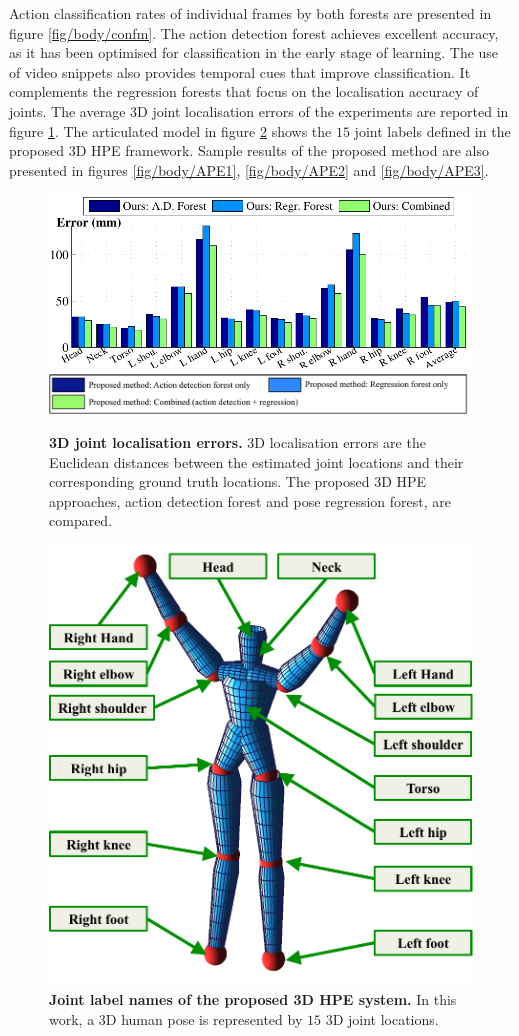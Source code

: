 Action classification rates of individual frames by both forests are presented in figure \ref{fig/body/confm}. 
The action detection forest achieves excellent accuracy, as it has been optimised for classification in the early stage of learning. The use of video snippets also provides temporal cues that improve classification. It complements the regression forests that focus on the localisation accuracy of joints.    
The average 3D joint localisation errors of the experiments are reported in figure \ref{fig/body/errorplot3d}. 
The articulated model in figure \ref{fig/body/jointlabels} shows the $15$ joint labels defined in the proposed 3D HPE framework.
Sample results of the proposed method are also presented in figures \ref{fig/body/APE1}, \ref{fig/body/APE2} and \ref{fig/body/APE3}. 

\begin{figure}[ht]
\centering
	\includegraphics[width=0.9\linewidth, trim = {0 0 0 8mm}, clip]{fig/body/errplot3d.pdf} 
	\includegraphics[width=1\linewidth]{fig/body/legend_small.pdf} 
	\caption{\textbf{3D joint localisation errors.} 3D localisation errors are the Euclidean distances between the estimated joint locations and their corresponding ground truth locations. The proposed 3D HPE approaches, \ie action detection forest and pose regression forest, are compared. }
\label{fig/body/errorplot3d}
\end{figure}

\begin{figure}[ht]
\centering
	\includegraphics[width=0.45\linewidth]{fig/body/body_body.pdf} 
	\caption{\textbf{Joint label names of the proposed 3D HPE system.} In this work, a 3D human pose is represented by $15$ 3D joint locations. }
\label{fig/body/jointlabels}
\end{figure}


